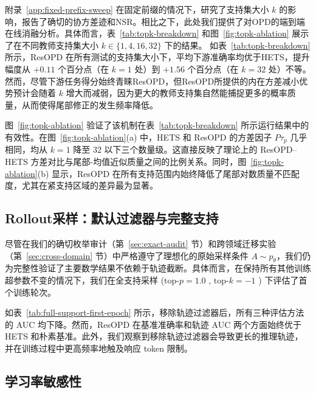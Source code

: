 附录~\ref{app:fixed-prefix-sweep} 在固定前缀的情况下，研究了支持集大小 $k$ 的影响，报告了确切的协方差迹和NSR。相比之下，此处我们提供了对OPD的端到端在线消融分析。具体而言，表~\ref{tab:topk-breakdown} 和图~\ref{fig:topk-ablation} 展示了在不同教师支持集大小 $k \in \{1, 4, 16, 32\}$ 下的结果。  
如表~\ref{tab:topk-breakdown} 所示，ResOPD 在所有测试的支持集大小下，平均下游准确率均优于HETS，提升幅度从 $+0.11$ 个百分点（在 $k=1$ 处）到 $+1.56$ 个百分点（在 $k=32$ 处）不等。  
然而，尽管下游任务得分始终青睐ResOPD，但ResOPD所提供的内在方差减小优势预计会随着 $k$ 增大而减弱，因为更大的教师支持集自然能捕捉更多的概率质量，从而使得尾部修正的发生频率降低。

图~\ref{fig:topk-ablation} 验证了该机制在表~\ref{tab:topk-breakdown} 所示运行结果中的有效性。在图~\ref{fig:topk-ablation}(a) 中，HETS 和 ResOPD 的方差因子 $P\tau_p$ 几乎相同，均从 $k=1$ 降至 $32$ 以下三个数量级。这直接反映了理论上的 ResOPD--HETS 方差对比与尾部-均值近似质量之间的比例关系。同时，图~\ref{fig:topk-ablation}(b) 显示，ResOPD 在所有支持范围内始终降低了尾部对数质量不匹配度，尤其在紧支持区域的差异最为显著。

\subsection{Rollout采样：默认过滤器与完整支持}
\label{sec:rollout-ablation}
尽管在我们的确切枚举审计（第~\ref{sec:exact-audit} 节）和跨领域迁移实验（第~\ref{sec:cross-domain} 节）中严格遵守了理想化的原始采样条件 $A\sim p_\theta$，我们仍为完整性验证了主要数学结果不依赖于轨迹截断。具体而言，在保持所有其他训练超参数不变的情况下，我们在全支持采样 ($\text{top-}p=1.0$ , $\text{top-}k=-1$ ) 下评估了首个训练轮次。

如表~\ref{tab:full-support-first-epoch} 所示，移除轨迹过滤器后，所有三种评估方法的 AUC 均下降。然而，ResOPD 在基准准确率和轨迹 AUC 两个方面始终优于 HETS 和朴素基准。此外，我们观察到移除轨迹过滤器会导致更长的推理轨迹，并在训练过程中更高频率地触及响应 token 限制。


\subsection{学习率敏感性}
\label{sec:lr-sensitivity}

